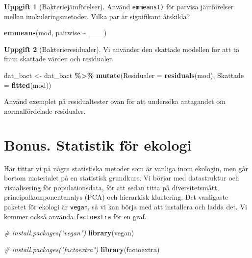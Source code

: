 \documentclass[
]{book}
\newenvironment{Shaded}{\begin{snugshade}}{\end{snugshade}}
\newcommand{\AttributeTok}[1]{\textcolor[rgb]{0.13,0.29,0.53}{#1}}
\newcommand{\CommentTok}[1]{\textcolor[rgb]{0.56,0.35,0.01}{\textit{#1}}}
\newcommand{\FunctionTok}[1]{\textcolor[rgb]{0.13,0.29,0.53}{\textbf{#1}}}
\newcommand{\NormalTok}[1]{#1}
\newcommand{\OtherTok}[1]{\textcolor[rgb]{0.56,0.35,0.01}{#1}}
\newcommand{\SpecialCharTok}[1]{\textcolor[rgb]{0.81,0.36,0.00}{\textbf{#1}}}
\theoremstyle{definition}
\theoremstyle{definition}
\theoremstyle{definition}
\newtheorem{exercise}{Uppgift}[chapter]
\theoremstyle{definition}
\theoremstyle{remark}
\begin{document}
\begin{exercise}[Bakteriejämförelser]

Använd \texttt{emmeans()} för parvisa jämförelser mellan inokuleringsmetoder. Vilka par är signifikant åtskilda?

\begin{Shaded}
\begin{Highlighting}[]
\FunctionTok{emmeans}\NormalTok{(mod, pairwise }\SpecialCharTok{\textasciitilde{}}\NormalTok{ \_\_\_)}
\end{Highlighting}
\end{Shaded}

\end{exercise}

\begin{exercise}[Bakterieresidualer]
Vi använder den skattade modellen för att ta fram skattade värden och residualer.

\begin{Shaded}
\begin{Highlighting}[]
\NormalTok{dat\_bact }\OtherTok{\textless{}{-}}\NormalTok{ dat\_bact }\SpecialCharTok{\%\textgreater{}\%} 
  \FunctionTok{mutate}\NormalTok{(}\AttributeTok{Residualer =} \FunctionTok{residuals}\NormalTok{(mod),}
         \AttributeTok{Skattade =} \FunctionTok{fitted}\NormalTok{(mod))}
\end{Highlighting}
\end{Shaded}

Använd exemplet på residualtester ovan för att undersöka antagandet om normalfördelade residualer.
\end{exercise}

\hypertarget{bonus.-statistik-fuxf6r-ekologi}{%
\section{Bonus. Statistik för ekologi}\label{bonus.-statistik-fuxf6r-ekologi}}

Här tittar vi på några statistiska metoder som är vanliga inom ekologin, men går bortom materialet på en statistisk grundkurs. Vi börjar med datastruktur och visualisering för populationsdata, för att sedan titta på diversitetsmått, principalkomponentanalys (PCA) och hierarkisk klustering. Det vanligaste paketet för ekologi är \texttt{vegan}, så vi kan börja med att installera och ladda det. Vi kommer också använda \texttt{factoextra} för en graf.

\begin{Shaded}
\begin{Highlighting}[]
\CommentTok{\# install.packages("vegan")}
\FunctionTok{library}\NormalTok{(vegan)}

\CommentTok{\# install.packages("factoextra")}
\FunctionTok{library}\NormalTok{(factoextra)}
\end{Highlighting}
\end{Shaded}
\end{document}

